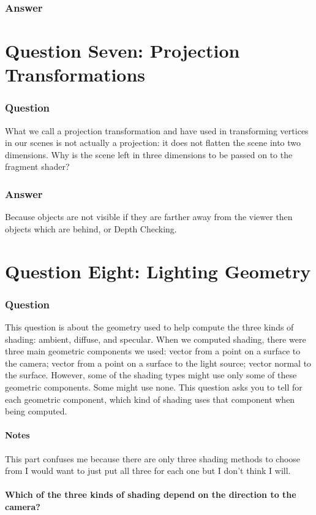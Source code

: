 \documentclass{report}
\begin{document}
\section{Answer}
\part{Question Seven: Projection Transformations}
\section{Question}
What we call a projection transformation and have used in transforming vertices in our scenes is not actually a projection: it does not flatten the scene into two dimensions. Why is the scene left in three dimensions to be passed on to the fragment shader?
\section{Answer}
Because objects are not visible if they are farther away from the viewer then objects which are behind, or Depth Checking.
\part{Question Eight: Lighting Geometry}
\section{Question}
This question is about the geometry used to help compute the three kinds of shading: ambient, diffuse, and specular. When we computed shading, there were three main geometric components we used: vector from a point on a surface to the camera; vector from a point on a surface to the light source; vector normal to the surface. However, some of the shading types might use only some of these geometric components. Some might use none. This question asks you to tell for each geometric component, which kind of shading uses that component when being computed.
\subsection{Notes}
This part confuses me because there are only three shading methods to choose from I would want to just put all three for each one but I don't think I will.
\subsection{Which of the three kinds of shading depend on the direction to the camera?}
\end{document}

